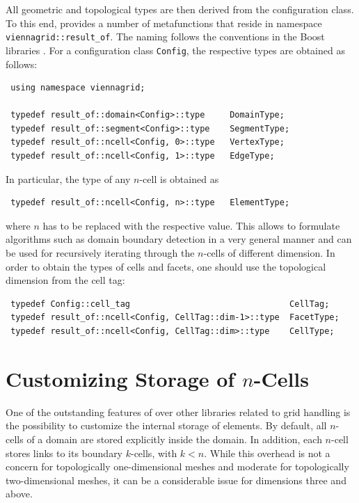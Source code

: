 All geometric and topological types are then derived from the configuration class. To this end, {\ViennaGrid} provides
a number of metafunctions that reside in namespace \lstinline|viennagrid::result_of|. The naming follows the conventions in the Boost libraries \cite{boost}.
For a configuration class \lstinline|Config|, the respective types are obtained as follows:
\begin{lstlisting}
 using namespace viennagrid;

 typedef result_of::domain<Config>::type     DomainType;
 typedef result_of::segment<Config>::type    SegmentType;
 typedef result_of::ncell<Config, 0>::type   VertexType;
 typedef result_of::ncell<Config, 1>::type   EdgeType;
\end{lstlisting}
In particular, the type of any $n$-cell is obtained as
\begin{lstlisting}
 typedef result_of::ncell<Config, n>::type   ElementType;
\end{lstlisting}
where $n$ has to be replaced with the respective value. This allows to formulate algorithms such as domain boundary detection in a very general manner and can be used for recursively iterating through the $n$-cells of different dimension. In order to obtain the types of cells and facets, one should use the topological dimension from the cell tag:
\begin{lstlisting}
 typedef Config::cell_tag                                CellTag;
 typedef result_of::ncell<Config, CellTag::dim-1>::type  FacetType;
 typedef result_of::ncell<Config, CellTag::dim>::type    CellType;
\end{lstlisting}





\section{Customizing Storage of $n$-Cells} \label{sec:customizing-storage}
One of the outstanding features of {\ViennaGrid} over other libraries related to grid handling is the possibility to customize the internal storage of elements. By default, all $n$-cells of a domain are stored explicitly inside the domain. In addition, each $n$-cell stores links to its boundary $k$-cells, with $k<n$. While this overhead is not a concern for topologically one-dimensional meshes and moderate for topologically two-dimensional meshes, it can be a considerable issue for dimensions three and above. 

